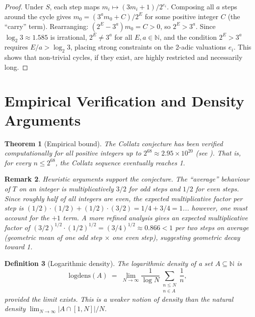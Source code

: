 \documentclass[12pt,a4paper]{article}
\newtheorem{theorem}{Theorem}[section]
\newtheorem{definition}[theorem]{Definition}
\newtheorem{remark}[theorem]{Remark}
\begin{document}
\begin{proof}
Under $S$, each step maps $m_i \mapsto (3m_i + 1)/2^{e_i}$. Composing all $a$ steps around the
cycle gives $m_0 = (3^a m_0 + C) / 2^E$
for some positive integer $C$ (the ``carry'' term). Rearranging:
$(2^E - 3^a) m_0 = C > 0$,
so $2^E > 3^a$. Since $\log_2 3 \approx 1.585$ is irrational, $2^E \neq 3^a$ for all
$E, a \in \mathbb{N}$, and the condition $2^E > 3^a$ requires $E/a > \log_2 3$,
placing strong constraints on the 2-adic valuations $e_i$. This shows that non-trivial
cycles, if they exist, are highly restricted and necessarily long.
\end{proof}

\section{Empirical Verification and Density Arguments}

\begin{theorem}[Empirical bound]\label{thm:empirical}
The Collatz conjecture has been verified computationally for all positive integers up to
$2^{68} \approx 2.95 \times 10^{20}$
(see \cite{Barina2020}). That is, for every $n \leq 2^{68}$, the Collatz sequence
eventually reaches 1.
\end{theorem}

\begin{remark}\label{rem:heuristics}
Heuristic arguments support the conjecture. The ``average'' behaviour of $T$ on an integer
is multiplicatively $3/2$ for odd steps and $1/2$ for even steps. Since roughly half of
all integers are even, the expected multiplicative factor per step is
$(1/2) \cdot (1/2) + (1/2) \cdot (3/2) = 1/4 + 3/4 = 1$... however, one must account
for the $+1$ term. A more refined analysis gives an expected multiplicative factor of
$(3/2)^{1/2} \cdot (1/2)^{1/2} = (3/4)^{1/2} \approx 0.866 < 1$
per two steps on average (geometric mean of one odd step $\times$ one even step),
suggesting geometric decay toward 1.
\end{remark}

\begin{definition}[Logarithmic density]\label{def:logdens}
The \emph{logarithmic density} of a set $A \subseteq \mathbb{N}$ is
\[
  \mathrm{logdens}(A) \;=\; \lim_{N \to \infty} \frac{1}{\log N} \sum_{\substack{n \leq N \\ n \in A}} \frac{1}{n},
\]
provided the limit exists. This is a weaker notion of density than the natural density
$\lim_{N\to\infty} |A \cap [1,N]|/N$.
\end{definition}
\end{document}
